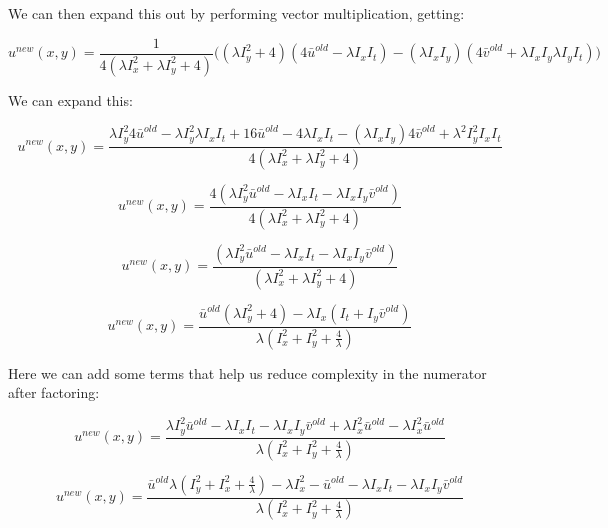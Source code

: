 \documentclass{article}
\begin{document}
\noindent We can then expand this out by performing vector multiplication, getting:

\begin{equation}
    u^{new}(x,y) = \frac{1}{4(\lambda I_x^2 + \lambda I_y^2 + 4)}
    \big(
    (\lambda I_y^2 +4)(4\bar{u}^{old}-\lambda I_x I_t) - (\lambda I_x I_y)(4\bar{v}^{old}+\lambda I_x I_y \lambda I_y I_t)
    )
\end{equation}

\noindent We can expand this:

\begin{equation}
    u^{new}(x,y) = \frac
    {\lambda I_y^2 4\bar{u}^{old}-\lambda I_y^2 \lambda I_x I_t + 16\bar{u}^{old}-4\lambda I_x I_t-(\lambda I_x I_y)4\bar{v}^{old}+\lambda^2 I_y^2 I_x I_t}
    {4(\lambda I_x^2 + \lambda I_y^2 + 4)}
\end{equation}

\begin{equation}
    u^{new}(x,y) = \frac
    {4(\lambda I_y^2 \bar{u}^{old} - \lambda I_x I_t - \lambda I_x I_y \bar{v}^{old})}
    {4(\lambda I_x^2 + \lambda I_y^2 + 4)}
\end{equation}

\begin{equation}
    u^{new}(x,y) = \frac
    {(\lambda I_y^2 \bar{u}^{old} - \lambda I_x I_t - \lambda I_x I_y \bar{v}^{old})}
    {(\lambda I_x^2 + \lambda I_y^2 + 4)}
\end{equation}

\begin{equation}
    u^{new}(x,y) = \frac
    {\bar{u}^{old} (\lambda I_y^2 + 4) - \lambda I_x (I_t + I_y \bar{v}^{old})}
    {\lambda (I_x^2 + I_y^2 + \frac{4}{\lambda})}
\end{equation}

\noindent Here we can add some terms that help us reduce complexity in the numerator after factoring:

\begin{equation}
    u^{new}(x,y) = \frac
    {\lambda I_y^2 \bar{u}^{old} - \lambda I_x I_t - \lambda I_x I_y \bar{v}^{old} + \lambda I_x^2 \bar{u}^{old}-\lambda I_x^2 \bar{u}^{old}}
    {\lambda (I_x^2 + I_y^2 + \frac{4}{\lambda})}
\end{equation}

\begin{equation}
    u^{new}(x,y) = \frac
    {\bar{u}^{old}\lambda(I_y^2 +  I_x^2 + \frac{4}{\lambda}) - \lambda I_x^2 - \bar{u}^{old} - \lambda I_x I_t - \lambda I_x I_y \bar{v}^{old}}
    {\lambda (I_x^2 + I_y^2 + \frac{4}{\lambda})}
\end{equation}
\end{document}
